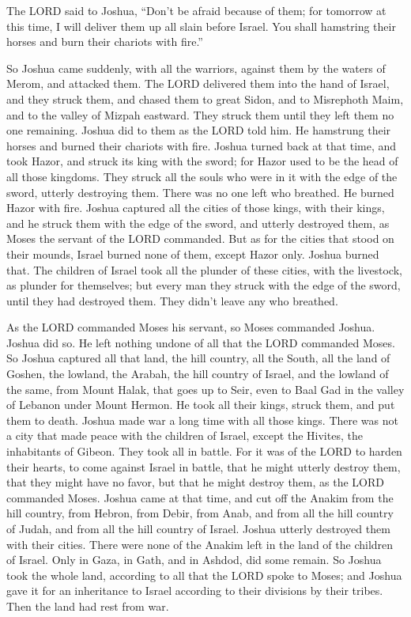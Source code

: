 \myverse{}The LORD said to Joshua, “Don’t be afraid because of them; for
tomorrow at this time, I will deliver them up all slain before Israel. You shall hamstring their horses
and burn their chariots with fire.”

\myverse{}So Joshua came suddenly, with all the warriors, against them by
the waters of Merom, and attacked them.
\myverse{}The LORD delivered them into the hand of Israel, and they struck them, and
chased them to great Sidon, and to Misrephoth Maim, and to the valley of Mizpah eastward. They struck
them until they left them no one remaining.
\myverse{}Joshua did to them as the LORD told him. He hamstrung their horses and burned
their chariots with fire.
\myverse{}Joshua turned back at that time, and took Hazor, and struck its king with
the sword; for Hazor used to be the head of all those kingdoms.
\myverse{}They struck all the souls who were in it with the edge of the sword, utterly
destroying them. There was no one left who breathed. He burned Hazor with fire.
\myverse{}Joshua captured all the cities of those kings, with their kings, and he struck
them with the edge of the sword, and utterly destroyed them, as Moses the servant of the LORD commanded.
\myverse{}But as for the cities that stood on their mounds, Israel burned none of them,
except Hazor only. Joshua burned that.
\myverse{}The children of Israel took all the plunder of these cities, with the livestock,
as plunder for themselves; but every man they struck with the edge of the sword, until they had destroyed
them. They didn’t leave any who breathed.

\myverse{}As the LORD commanded Moses his servant, so Moses commanded
Joshua. Joshua did so. He left nothing undone of all that the LORD commanded Moses.
\myverse{}So Joshua captured all that land, the hill country, all the South, all the
land of Goshen, the lowland, the Arabah, the hill country of Israel, and the lowland of the same,
\myverse{}from Mount Halak, that goes up to Seir, even to Baal Gad in the valley of
Lebanon under Mount Hermon. He took all their kings, struck them, and put them to death.
\myverse{}Joshua made war a long time with all those kings.
\myverse{}There was not a city that made peace with the children of Israel, except
the Hivites, the inhabitants of Gibeon. They took all in battle.
\myverse{}For it was of the LORD to harden their hearts, to come against Israel in
battle, that he might utterly destroy them, that they might have no favor, but that he might destroy them,
as the LORD commanded Moses.
\myverse{}Joshua came at that time, and cut off the Anakim from the hill country, from
Hebron, from Debir, from Anab, and from all the hill country of Judah, and from all the hill country of
Israel. Joshua utterly destroyed them with their cities.
\myverse{}There were none of the Anakim left in the land of the children of Israel.
Only in Gaza, in Gath, and in Ashdod, did some remain.
\myverse{}So Joshua took the whole land, according to all that the LORD spoke to Moses;
and Joshua gave it for an inheritance to Israel according to their divisions by their tribes. Then the
land had rest from war.


